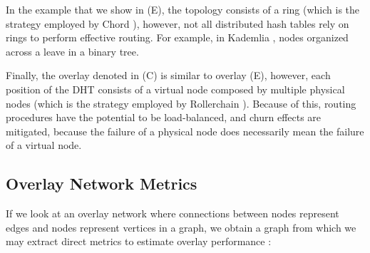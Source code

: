 In the example that we show in (E), the topology consists of a ring (which is the strategy employed by Chord \cite{stoica2003chord}), however, not all distributed hash tables rely on rings to perform effective routing. For example, in Kademlia \cite{maymounkov2002kademlia}, nodes organized across a leave in a binary tree.

Finally, the overlay denoted in (C) is similar to overlay (E), however, each position of the DHT consists of a virtual node composed by multiple physical nodes (which is the strategy employed by Rollerchain \cite{rollerchain}). Because of this, routing procedures have the potential to be load-balanced, and churn effects are mitigated, because the failure of a physical node does necessarily mean the failure of a virtual node. 
 
\subsection{Overlay Network Metrics}

If we look at an overlay network where connections between nodes represent edges and nodes represent vertices in a graph, we obtain a graph from which we may extract direct metrics to estimate overlay performance \cite{leitaoPHDthesis}:

